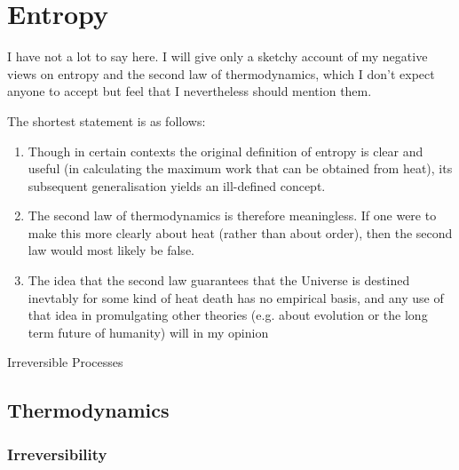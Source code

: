 \documentclass[10pt,titlepage]{book}
\newcommand{\ignore}[1]{}
\begin{document}
\chapter{Entropy}

I have not a lot to say here.
I will give only a sketchy account of my negative views on entropy and the second law of thermodynamics, which I don't expect anyone to accept but feel that I nevertheless should mention them.

The shortest statement is as follows:
\begin{enumerate}

\item Though in certain contexts the original definition of entropy is clear and useful (in calculating the maximum work that can be obtained from heat), its subsequent generalisation yields an ill-defined concept.
\item The second law of thermodynamics is therefore meaningless.
  If one were to make this more clearly about heat (rather than about order), then the second law would most likely be false.
  \item The idea that the second law guarantees that the Universe is destined inevtably for some kind of heat death has no empirical basis, and any use of that idea in promulgating other theories (e.g. about evolution or the long term future of humanity) will in my opinion 
\end{enumerate}


\begin{description}
\item[Irreversible Processes]
  \item[]
  \item[]
  \item[]
  \item[]
  \item[]
\end{description}

\section{Thermodynamics}

\subsection{Irreversibility}
\ignore{
  Do the facts about entropy go beyond what is found in Newtonian physics or are they derivable from them?
  Is the Second Law a physical theory or a statistical one?
  How, if ever, does entropy increase?
  Are there absolutely irreversible processes?
}%
\end{document}
